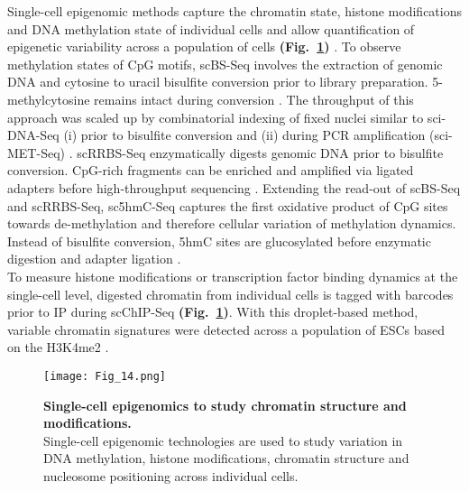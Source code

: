 Single-cell epigenomic methods capture the chromatin state, histone modifications and DNA methylation state of individual cells and allow quantification of epigenetic variability across a population of cells \textbf{(Fig.~\ref{fig0:scEpigenomics})} \citep{Clark2016}. To observe methylation states of CpG motifs, \gls{scBS-Seq} involves the extraction of genomic DNA and cytosine to uracil bisulfite conversion prior to library preparation. 5-methylcytosine remains intact during conversion \citep{Smallwood2014, Farlik2015}. The throughput of this approach was scaled up by combinatorial indexing of fixed nuclei similar to sci-DNA-Seq (i) prior to bisulfite conversion and (ii) during PCR amplification (sci-MET-Seq) \citep{Basque2017}. \Gls{scRRBS-Seq} enzymatically digests genomic DNA prior to bisulfite conversion. CpG-rich fragments can be enriched and amplified via ligated adapters before high-throughput sequencing \citep{Guo2013}. Extending the read-out of scBS-Seq and scRRBS-Seq, \gls{sc5hmC-Seq} captures the first oxidative product of CpG sites towards de-methylation and therefore cellular variation of methylation dynamics. Instead of bisulfite conversion, 5hmC sites are glucosylated before enzymatic digestion and adapter ligation \citep{Mooijman2016}. \\

To measure histone modifications or transcription factor binding dynamics at the single-cell level, digested chromatin from individual cells is tagged with barcodes prior to \gls{IP} during \gls{scChIP-Seq} \textbf{(Fig.~\ref{fig0:scEpigenomics})}. With this droplet-based method, variable chromatin signatures were detected across a population of ESCs based on the \gls{H3K4me2} \citep{Rotem2015}. 

\begin{figure}[!h]
\centering
\texttt{[image: Fig\_14.png]}
\caption[Single-cell epigenomics to study chromatin structure and modifications]{\textbf{Single-cell epigenomics to study chromatin structure and modifications.}\\
Single-cell epigenomic technologies are used to study variation in DNA methylation, histone modifications, chromatin structure and nucleosome positioning across individual cells.}
\label{fig0:scEpigenomics}
\end{figure}

